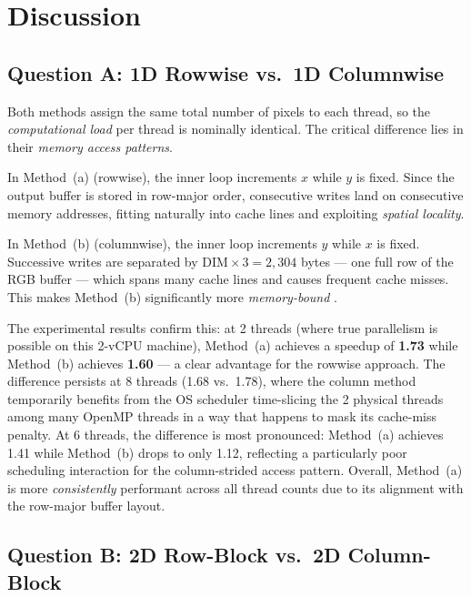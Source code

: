 \section{Discussion}

\subsection{Question A: 1D Rowwise vs.\ 1D Columnwise}

Both methods assign the same total number of pixels to each thread, so the
\emph{computational load} per thread is nominally identical.
The critical difference lies in their \emph{memory access patterns}.

In Method~(a) (rowwise), the inner loop increments $x$ while $y$ is fixed.
Since the output buffer is stored in row-major order, consecutive writes land on
consecutive memory addresses, fitting naturally into cache lines and exploiting
\emph{spatial locality}.

In Method~(b) (columnwise), the inner loop increments $y$ while $x$ is fixed.
Successive writes are separated by $\text{DIM} \times 3 = 2{,}304$ bytes — one full
row of the RGB buffer — which spans many cache lines and causes frequent cache misses.
This makes Method~(b) significantly more \emph{memory-bound}
\citep{grama2003introduction}.

The experimental results confirm this: at 2 threads (where true parallelism is possible
on this 2-vCPU machine), Method~(a) achieves a speedup of \textbf{1.73} while
Method~(b) achieves \textbf{1.60} — a clear advantage for the rowwise approach.
The difference persists at 8 threads (1.68 vs.\ 1.78), where the column method
temporarily benefits from the OS scheduler time-slicing the 2 physical threads among
many OpenMP threads in a way that happens to mask its cache-miss penalty.
At 6 threads, the difference is most pronounced: Method~(a) achieves 1.41 while
Method~(b) drops to only 1.12, reflecting a particularly poor scheduling interaction
for the column-strided access pattern.
Overall, Method~(a) is more \emph{consistently} performant across all thread counts
due to its alignment with the row-major buffer layout.

\subsection{Question B: 2D Row-Block vs.\ 2D Column-Block}

